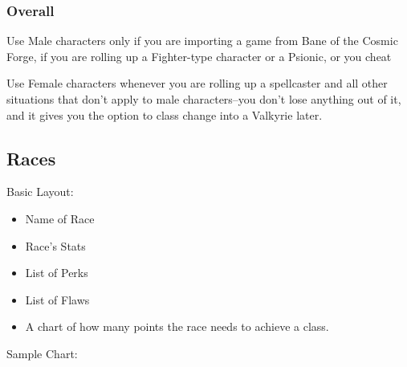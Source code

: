 \documentclass[12pt]{article}
\providecommand{\tightlist}{%
  \setlength{\itemsep}{0pt}\setlength{\parskip}{0pt}}
\begin{document}
\subsubsection{Overall}\label{overall}

Use Male characters only if you are importing a game from Bane of the
Cosmic Forge, if you are rolling up a Fighter-type character or a
Psionic, or you cheat

Use Female characters whenever you are rolling up a spellcaster and all
other situations that don't apply to male characters--you don't lose
anything out of it, and it gives you the option to class change into a
Valkyrie later.

\subsection{Races}\label{races}

Basic Layout:

\begin{itemize}
\tightlist
\item Name of Race
\item Race's Stats
\item List of Perks
\item List of Flaws
\item A chart of how many points the race needs to achieve a class.
\end{itemize}

Sample Chart:
\end{document}
